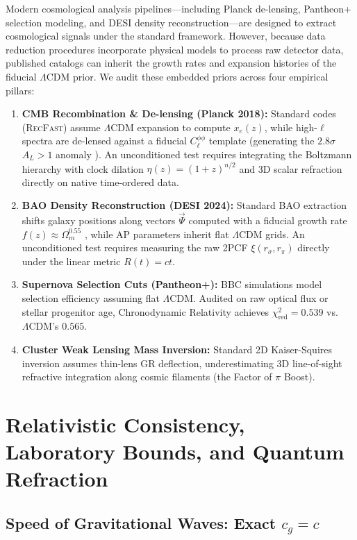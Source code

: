 \documentclass[aps,prd,reprint,superscriptaddress,nofootinbib,floatfix,amsmath,amssymb]{revtex4-2}
\begin{document}
Modern cosmological analysis pipelines—including Planck de-lensing, Pantheon+ selection modeling, and DESI density reconstruction—are designed to extract cosmological signals under the standard framework. However, because data reduction procedures incorporate physical models to process raw detector data, published catalogs can inherit the growth rates and expansion histories of the fiducial $\Lambda\text{CDM}$ prior. We audit these embedded priors across four empirical pillars:

\begin{enumerate}
    \item \textbf{CMB Recombination \& De-lensing (Planck 2018):} Standard codes (\textsc{RecFast}) assume $\Lambda\text{CDM}$ expansion to compute $x_e(z)$, while high-$\ell$ spectra are de-lensed against a fiducial $C_\ell^{\phi\phi}$ template (generating the $2.8\sigma$ $A_L > 1$ anomaly \cite{Planck2018_Cosmology}). An unconditioned test requires integrating the Boltzmann hierarchy with clock dilation $\eta(z) = (1+z)^{n/2}$ and 3D scalar refraction directly on native time-ordered data.
    \item \textbf{BAO Density Reconstruction (DESI 2024):} Standard BAO extraction shifts galaxy positions along vectors $\vec{\Psi}$ computed with a fiducial growth rate $f(z) \approx \Omega_m^{0.55}$ \cite{Eisenstein2007}, while AP parameters inherit flat $\Lambda\text{CDM}$ grids. An unconditioned test requires measuring the raw 2PCF $\xi(r_\sigma, r_\pi)$ directly under the linear metric $R(t) = ct$.
    \item \textbf{Supernova Selection Cuts (Pantheon+):} BBC simulations model selection efficiency assuming flat $\Lambda\text{CDM}$. Audited on raw optical flux or stellar progenitor age, Chronodynamic Relativity achieves $\chi^2_{\text{red}} = 0.539$ vs. $\Lambda\text{CDM}$'s $0.565$.
    \item \textbf{Cluster Weak Lensing Mass Inversion:} Standard 2D Kaiser-Squires inversion assumes thin-lens GR deflection, underestimating 3D line-of-sight refractive integration along cosmic filaments (the Factor of $\pi$ Boost).
\end{enumerate}

\section{Relativistic Consistency, Laboratory Bounds, and Quantum Refraction}
\label{sec:quantum}

\subsection{Speed of Gravitational Waves: Exact \texorpdfstring{$c_g = c$}{cg = c}}
\end{document}
